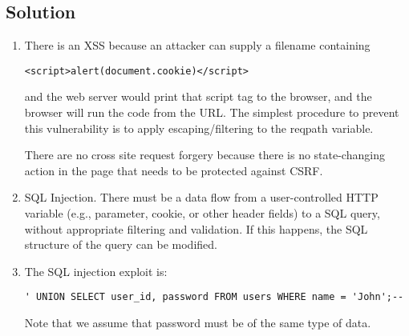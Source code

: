 \subsection*{Solution}
\begin{enumerate}
    \item There is an XSS because an attacker can supply a filename containing
\begin{verbatim}
<script>alert(document.cookie)</script> 
\end{verbatim}
        and the web server would print that script tag to the browser, and the browser will run the code from the URL.
        The simplest procedure to prevent this vulnerability is to apply escaping/filtering to the reqpath variable.

        There are no cross site request forgery because there is no state-changing action in the page that needs to be protected against CSRF.
    \item SQL Injection. 
        There must be a data flow from a user-controlled HTTP variable (e.g., parameter, cookie, or other header fields) to a SQL query, without appropriate filtering and validation. 
        If this happens, the SQL structure of the query can be modified.
    \item The SQL injection exploit is: 
\begin{verbatim}
' UNION SELECT user_id, password FROM users WHERE name = 'John';--
\end{verbatim}
        Note that we assume that password must be of the same type of data.  
\end{enumerate}